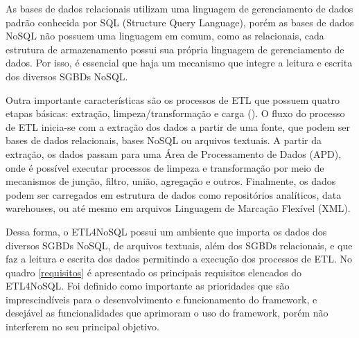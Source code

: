 As bases de dados relacionais utilizam uma linguagem de gerenciamento de dados padrão conhecida por SQL (Structure Query Language), porém as bases de dados NoSQL não possuem uma linguagem em comum, como as relacionais, cada estrutura de armazenamento possui sua própria linguagem de gerenciamento de dados. Por isso, é essencial que haja um mecanismo que integre a leitura e escrita dos diversos SGBDs NoSQL. 

Outra importante características são os processos de ETL que possuem quatro etapas básicas: extração, limpeza/transformação e carga (\cite{kimball:2004}). O fluxo do processo de ETL inicia-se com a extração dos dados a partir de uma fonte, que podem ser bases de dados relacionais, bases NoSQL ou arquivos textuais. A partir da extração, os dados passam para uma Área de Processamento de Dados (APD), onde é possível executar processos de limpeza e transformação por meio de mecanismos de junção, filtro, união, agregação e outros. Finalmente, os dados podem ser carregados em estrutura de dados como repositórios analíticos, data warehouses, ou até mesmo em arquivos Linguagem de Marcação Flexível (XML).

Dessa forma, o ETL4NoSQL possui um ambiente que importa os dados dos diversos SGBDs NoSQL, de arquivos textuais, além dos SGBDs relacionais, e que faz a leitura e escrita dos dados permitindo a execução dos processos de ETL. No quadro \ref{requisitos} é apresentado os principais requisitos elencados do ETL4NoSQL. Foi definido como importante as prioridades que são imprescindíveis para o desenvolvimento e funcionamento do framework, e desejável as funcionalidades que aprimoram o uso do framework, porém não interferem no seu principal objetivo.

